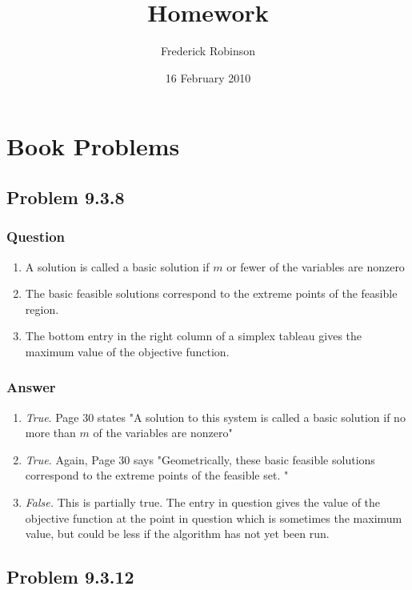 \documentclass[12pt]{article}
\title{Homework}
\author{Frederick Robinson}
\date{16 February 2010}
\begin{document}

   \maketitle

\setcounter{tocdepth}{2} 

\tableofcontents

\section{Book Problems}

\subsection{Problem 9.3.8}
\subsubsection{Question}
\begin{enumerate}
\item A solution is called a basic solution if $m$ or fewer of the variables are nonzero
\item The basic feasible solutions correspond to the extreme points of the feasible region.
\item The bottom entry in the right column of a simplex tableau gives the maximum value of the objective function.
\end{enumerate}

\subsubsection{Answer}
\begin{enumerate}
\item \emph{True}. Page 30 states "A solution to this system is called a basic solution if no more than $m$ of the variables are nonzero" 
\item \emph{True.} Again, Page 30 says "Geometrically, these basic feasible solutions correspond to the extreme points of the feasible set. "
\item \emph{False.} This is partially true. The entry in question gives the value of the objective function at the point in question which is sometimes the maximum value, but could be less if the algorithm has not yet been run.
\end{enumerate}

\subsection{Problem 9.3.12}
\end{document}
